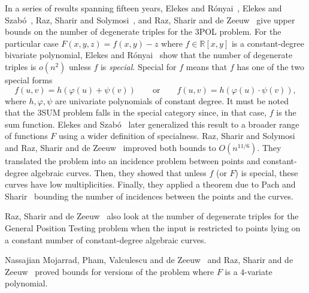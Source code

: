 In a series of results spanning fifteen years,
Elekes and Rónyai~\cite{ER00},
Elekes and Szabó~\cite{ES12},
Raz, Sharir and Solymosi~\cite{RSS14}, and
Raz, Sharir and de Zeeuw~\cite{RSZ15}
give upper bounds on the number of degenerate triples for the 3POL problem.
%
For the particular case $F(x,y,z) = f(x,y) - z$ where $f \in \mathbb{R}[x,y]$
is a constant-degree bivariate polynomial, Elekes and Rónyai~\cite{ER00} show
that the number of degenerate triples is $o(n^2)$ unless $f$ is
\emph{special}. Special for $f$ means that $f$ has one of the two special forms
\begin{displaymath}
f(u,v)=h(\varphi(u)+\psi(v))
\qquad
\text{or}
\qquad
f(u,v)=h(\varphi(u)\cdot\psi(v)),
\end{displaymath}
where $h,\varphi,\psi$ are univariate polynomials of constant degree.
It must be noted that the 3SUM problem falls in the special category since, in
that case, \( f \) is the sum function.
%
Elekes and Szabó~\cite{ES12} later generalized this result to a broader range
of functions $F$ using a wider definition of specialness.
%
Raz, Sharir and Solymosi~\cite{RSS14} and Raz, Sharir and de Zeeuw~\cite{RSZ15}
improved both bounds to $O(n^{11/6})$.
%
They translated the problem into an incidence problem between points and
constant-degree algebraic curves. Then, they showed that unless $f$ (or $F$) is
special, these curves have low multiplicities. Finally, they applied a theorem
due to Pach and Sharir~\cite{PS98} bounding the number of incidences between
the points and the curves.
%


Raz, Sharir and de Zeeuw~\cite{RSZ15} also look at the number of degenerate
triples for the General Position Testing problem when the input is restricted
to points lying on a constant number of constant-degree algebraic curves.
%


Nassajian Mojarrad, Pham, Valculescu and de Zeeuw~\cite{MPVd16} and
Raz, Sharir and de Zeeuw~\cite{RSZ16} proved bounds for versions of the
problem where $F$ is a $4$-variate polynomial.
